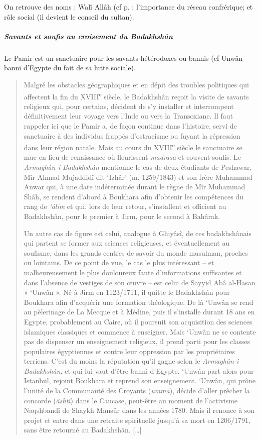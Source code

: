 \begin{Prop}
On retrouve des noms : Walî Allâh (cf p. \pageref{Theo:waliAllah}; l'importance du réseau confrérique; et rôle social (il devient le conseil du sultan).
\end{Prop}

\subparagraph{Savants et soufis au croisement du
Badakhshân}
Le Pamir est un sanctuaire pour les savants hétérodoxes ou bannis (cf Unwân banni d'Egypte du fait de sa lutte sociale).

\begin{quote}
Malgré les obstacles géographiques et en dépit des troubles politiques
qui affectent la fin du XVIII\textsuperscript{e} siècle, le Badakhshân
reçoit la visite de savants religieux qui, pour certains, décident de
s'y installer et interrompent définitivement leur voyage vers l'Inde ou
vers la Transoxiane. Il faut rappeler ici que le Pamir a, de façon
continue dans l'histoire, servi de sanctuaire à des individus frappés
d'ostracisme ou fuyant la répression dans leur région natale. Mais au cours du
XVIII\textsuperscript{e} siècle le sanctuaire se mue en lieu de
renaissance où fleurissent \emph{madrasa} et couvent soufis. Le
\emph{Armaghân-i Badakhshân} mentionne le cas de deux étudiants de
Peshawar, Mîr Ahmad Mujaddidî dit `Izhâr' (m. 1259/1843) et son frère
Muhammad Anwar qui, à une date indéterminée durant le règne de Mîr
Muhammad Shâh, se rendent d'abord à Boukhara afin d'obtenir les
compétences du rang de \emph{`âlim} et qui, lors de leur retour,
s'installent et officient au Badakhshân, pour le premier à Jirm, pour le
second à Bahârak.

Un autre cas de figure est celui, analogue à Ghiyâsî, de ces
badakhshânais qui partent se former aux sciences religieuses, et
éventuellement au soufisme, dans les grands centres de savoir du monde
musulman, proches ou lointains. De ce point de vue, le cas le plus
intéressant -- et malheureusement le plus douloureux faute
d'informations suffisantes et dans l'absence de vestiges de son œuvre --
est celui de Sayyid Abâ al-Hasan « `Unwân ». Né à Jirm en 1123/1711, il
quitte le Badakhshân pour Boukhara afin d'acquérir une formation
théologique. De là `Unwân se rend au pèlerinage de La Mecque et à
Médine, puis il s'installe durant 18 ans en Egypte, probablement au
Caire, où il poursuit son acquisition des sciences islamiques classiques
et commence à enseigner. Mais `Unwân ne se contente pas de dispenser un
enseignement religieux, il prend parti pour les classes populaires
égyptiennes et contre leur oppression par les propriétaires terriens.
C'est du moins la réputation qu'il gagne selon le \emph{Armaghân-i
Badakhshân}, et qui lui vaut d'être banni d'Egypte. `Unwân part alors
pour Istanbul, rejoint Boukhara et reprend son enseignement. `Unwân, qui
prône l'unité de la Communauté des Croyants (\emph{umma}), décide
d'aller prêcher la concorde (\emph{âshtî}) dans le Caucase, peut-être au
moment de l'activisme Naqshbandî de Shaykh Mansûr dans les années 1780.
Mais il renonce à son projet et entre dans une retraite spirituelle
jusqu'à sa mort en 1206/1791, sans être retourné au Badakhshân.
{[}\ldots{]}

\end{quote}


